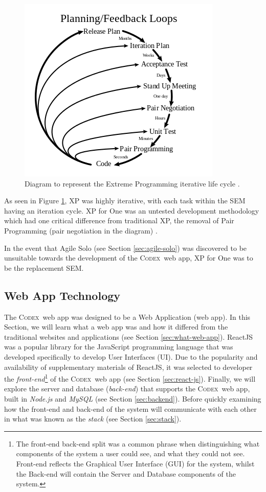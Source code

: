\documentclass[final]{cmpreport}
\newcommand{\Codex}{\textsc{Codex}}
\begin{document}
			\begin{figure}[H]
				\centering
				\includegraphics[width=0.6\linewidth]{xp.png}
				\caption[Extreme Programming Diagram]{Diagram to represent the Extreme Programming iterative life cycle \citep{xp-diag}.} \label{fig:xp}
			\end{figure}
			
			As seen in Figure \ref{fig:xp}, XP was highly iterative, with each task within the SEM having an iteration cycle. XP for One was an untested development methodology which had one critical difference from traditional XP, the removal of Pair Programming (pair negotiation in the diagram) \citep{SoloXP}. 
			
			In the event that Agile Solo (see Section \ref{sec:agile-solo}) was discovered to be unsuitable towards the development of the \Codex \ web app, XP for One was to be the replacement SEM.
			
		\subsection{Web App Technology} \label{sec:web-app}
		The \Codex \ web app was designed to be a Web Application (web app). In this Section, we will learn what a web app was and how it differed from the traditional websites and applications (see Section \ref{sec:what-web-app}). ReactJS was a popular library for the JavaScript programming language that was developed specifically to develop User Interfaces (UI). Due to the popularity and availability of supplementary materials of ReactJS, it was selected to developer the \textit{front-end}\footnote{The front-end back-end split was a common phrase when distinguishing what components of the system a user could see, and what they could not see. Front-end reflects the Graphical User Interface (GUI) for the system, whilst the Back-end will contain the Server and Database components of the system.} of  the \Codex \ web app (see Section \ref{sec:react-js}). Finally, we will explore the server and database (\textit{back-end}) that supports the \Codex \ web app, built in \textit{Node.js} and \textit{MySQL} (see Section \ref{sec:backend}). Before quickly examining how the front-end and back-end of the system will communicate with each other in what was known as the \emph{stack} (see Section \ref{sec:stack}).
		
\end{document}

